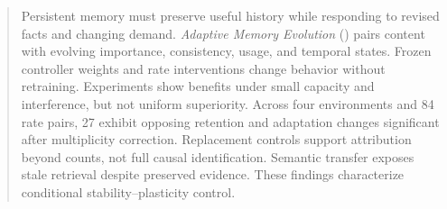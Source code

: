 \begin{abstract}
Persistent memory must preserve useful history while responding to revised facts and changing demand. \emph{Adaptive Memory Evolution} (\ame) pairs content with evolving importance, consistency, usage, and temporal states. Frozen controller weights and rate interventions change behavior without retraining. Experiments show benefits under small capacity and interference, but not uniform superiority. Across four environments and 84 rate pairs, 27 exhibit opposing retention and adaptation changes significant after multiplicity correction. Replacement controls support attribution beyond counts, not full causal identification. Semantic transfer exposes stale retrieval despite preserved evidence. These findings characterize conditional stability--plasticity control.
\end{abstract}
